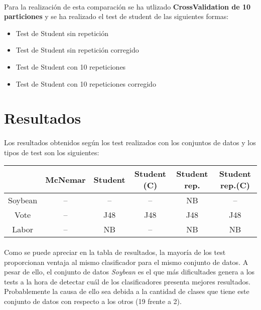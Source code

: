 \documentclass[10pt, a4paper,spanish]{article}
\begin{document}
		\paragraph{}
		Para la realización de esta comparación se ha utlizado \textbf{CrossValidation de 10 particiones} y se ha realizado el test de student de las siguientes formas:

		\begin{itemize}
			\item Test de Student sin repetición
			\item Test de Student sin repetición corregido
			\item Test de Student con 10 repeticiones
			\item Test de Student con 10 repeticiones corregido
		\end{itemize}

	\section{Resultados}

		\paragraph{}
		Los resultados obtenidos según los test realizados con los conjuntos de datos y los tipos de test son los siguientes:

		\hfill
		\begin{center}
			\begin{tabular}{ | c || c | c | c | c | c | }
				\hline
				 			& McNemar	& Student	& Student (C) 	& Student rep. 	& Student rep.(C) 	\\ \hline \hline
				Soybean 	& -- 		& --		& --			& NB			& --			 	\\ \hline
				Vote 		& -- 		& J48		& J48			& J48			& J48				\\ \hline
				Labor 		& -- 		& NB		& --			& NB			& NB				\\
				\hline
			\end{tabular}
		\end{center}


		\paragraph{}
		Como se puede apreciar en la tabla de resultados, la mayoría de los test proporcionan ventaja al mismo clasificador para el mismo conjunto de datos. A pesar de ello, el conjunto de datos \emph{Soybean} es el que más dificultades genera a los tests a la hora de detectar cuál de los clasificadores presenta mejores resultados. Probablemente la causa de ello sea debida a la cantidad de clases que tiene este conjunto de datos con respecto a los otros (19 frente a 2).
\end{document}
